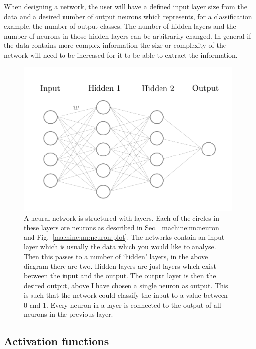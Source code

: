 When designing a network, the user will have a defined input layer size from the data and a desired number of output neurons which represents, for a classification example, the number of output classes. 
The number of hidden layers and the number of neurons in those hidden layers can be arbitrarily changed. 
In general if the data contains more complex information the size or complexity of the network will need to be increased for it to be able to extract the information. 

\begin{figure}[ht]
    \centering
    \includegraphics[width=\columnwidth]{C4_cnn/simple_network.pdf}
    \caption[Example structure of a neural network.]{A neural network is structured with layers. Each of the circles in these layers are neurons as described in Sec.~\ref{machine:nn:neuron} and Fig.~\ref{machine:nn:neuron:plot}. The networks contain an input layer which is usually the data which you would like to analyse. Then this passes to a number of `hidden' layers, in the above diagram there are two. Hidden layers are just layers which exist between the input and the output. The output layer is then the desired output, above I have chosen a single neuron as output. This is such that the network could classify the input to a value between 0 and 1. Every neuron in a layer is connected to the output of all neurons in the previous layer.}
    \label{machine:nn:structure:plot}
\end{figure}


\subsection{\label{machine:nn:activation}Activation functions}

